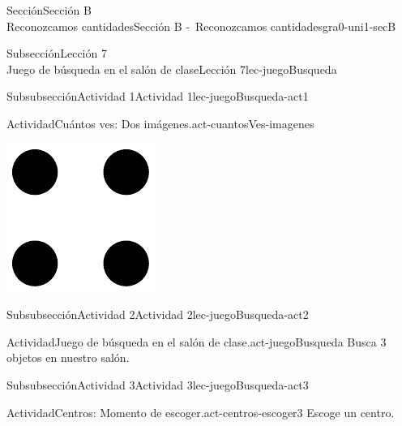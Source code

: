 \begin{sectionptx}{Sección}{{\Large Sección B\\}Reconozcamos cantidades}{}{Sección B -~Reconozcamos cantidades}{}{}{gra0-uni1-secB}
\begin{subsectionptx}{Subsección}{{\normalsize Lección 7\\[-0.05cm]}Juego de búsqueda en el salón de clase}{}{Lección 7}{}{}{lec-juegoBusqueda}
\begin{subsubsectionptx}{Subsubsección}{Actividad 1}{}{Actividad 1}{}{}{lec-juegoBusqueda-act1}
\begin{activity}{Actividad}{Cuántos ves: Dos imágenes.}{act-cuantosVes-imagenes}
\begin{sidebyside}{2}{0}{0}{0}
\begin{sbspanel}{0.5}
\includegraphics[max width=\linewidth, center]{external/svg-source/tikz-file-148153.pdf}
\end{sbspanel}%
\end{sidebyside}%
\end{activity}%
\end{subsubsectionptx}
%
%
\typeout{************************************************}
\typeout{************************************************}
%
\begin{subsubsectionptx}{Subsubsección}{Actividad 2}{}{Actividad 2}{}{}{lec-juegoBusqueda-act2}
\begin{activity}{Actividad}{Juego de búsqueda en el salón de clase.}{act-juegoBusqueda}%
Busca 3 objetos en nuestro salón.%
\end{activity}%
\end{subsubsectionptx}
%
%
\typeout{************************************************}
\typeout{************************************************}
%
\clearpage
\begin{subsubsectionptx}{Subsubsección}{Actividad 3}{}{Actividad 3}{}{}{lec-juegoBusqueda-act3}
\begin{activity}{Actividad}{Centros: Momento de escoger.}{act-centros-escoger3}%
Escoge un centro.%
\begin{sidebyside}{2}{0.025}{0.025}{0.05}%

\end{sidebyside}
\end{activity}
\end{subsubsectionptx}
\end{subsectionptx}
\end{sectionptx}
